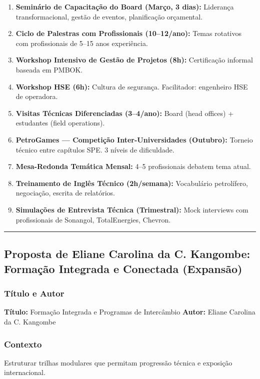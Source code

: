 \documentclass[12pt,a4paper]{article}
\newcommand{\proposalsep}{%
  \vspace{6pt}%
  {\color{gold}\rule{0.35\linewidth}{0.7pt}}%
  \vspace{4pt}%
}
\begin{document}
\begin{enumerate}
    \item \textbf{Seminário de Capacitação do Board (Março, 3 dias):} Liderança transformacional, gestão de eventos, planificação orçamental.
    \item \textbf{Ciclo de Palestras com Profissionais (10–12/ano):} Temas rotativos com profissionais de 5–15 anos experiência.
    \item \textbf{Workshop Intensivo de Gestão de Projetos (8h):} Certificação informal baseada em PMBOK.
    \item \textbf{Workshop HSE (6h):} Cultura de segurança. Facilitador: engenheiro HSE de operadora.
    \item \textbf{Visitas Técnicas Diferenciadas (3–4/ano):} Board (head offices) + estudantes (field operations).
    \item \textbf{PetroGames — Competição Inter-Universidades (Outubro):} Torneio técnico entre capítulos SPE. 3 níveis de dificuldade.
    \item \textbf{Mesa-Redonda Temática Mensal:} 4–5 profissionais debatem tema atual.
    \item \textbf{Treinamento de Inglês Técnico (2h/semana):} Vocabulário petrolífero, negociação, escrita de relatórios.
    \item \textbf{Simulações de Entrevista Técnica (Trimestral):} Mock interviews com profissionais de Sonangol, TotalEnergies, Chevron.
\end{enumerate}

\proposalsep

\subsection{Proposta de Eliane Carolina da C. Kangombe: Formação Integrada e Conectada (Expansão)}

\subsubsection*{Título e Autor}
\textbf{Título:} Formação Integrada e Programas de Intercâmbio \quad \textbf{Autor:} Eliane Carolina da C. Kangombe

\subsubsection*{Contexto}
Estruturar trilhas modulares que permitam progressão técnica e exposição internacional.
\end{document}
